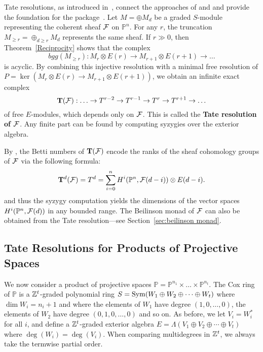 \documentclass[twoside,12pt, leqno]{amsart}
\def\PP{{\mathbb P}}
\DeclareMathOperator{\rH}{{\rm H}}
\def\bT{{\bf T}}
\def\bU{{\bf U}}
\def\rH{{\rm H}}
\begin{document}
Tate resolutions, as introduced in~\cite{EFS}, connect the approaches of \cite{BGG} and \cite{beilinson} and provide the foundation for the package~\cite{M2BGG}.
Let $M=\oplus M_d$ be a graded $S$-module representing the coherent sheaf ${\mathcal F}$ on $\PP^n$. For any $r$, the truncation $M_{\ge r} = \oplus_{d \ge r}M_d$ represents the same sheaf.  If $r\gg 0$, then Theorem~\ref{Reciprocity} shows that the  complex
$$
bgg(M_{\ge r}) : M_r\otimes E(r) \to M_{r+1}\otimes E(r+1) \to \ldots
$$ 
is acyclic. By combining this injective resolution with a minimal free resolution of $P=\ker(M_r\otimes E(r) \to M_{r+1}\otimes E(r+1))$, we obtain an infinite exact complex
$$
\bT(\sF):   \ldots \to T^{r-2} \to T^{r-1} \to T^r \to T^{r+1} \to \ldots
$$
of free $E$-modules, which depends only on ${\mathcal F}$.  This is called the {\bf Tate resolution of ${\mathcal F}$}. Any finite part can be found by computing syzygies over the exterior algebra.

By \cite[Theorem 4.1] {EFS}, the Betti numbers of $\bT(\sF)$ encode the ranks of the sheaf cohomology groups of ${\mathcal F}$ via the following formula:
$$
\bT^d(\sF) =T^d= \sum_{i=0}^n H^i(\PP^n,\sF(d-i)) \otimes E(d-i).
$$
and thus the syzygy computation yields the dimensions of the vector spaces $H^i(\PP^n,\sF(d))$ in any bounded range. The Beilinson monad of ${\mathcal F}$ can also be obtained from the Tate resolution---see Section~\ref{sec:beilinson monad}.

% 
% 

\subsection{Tate Resolutions for Products of Projective Spaces}
We now consider a product of projective spaces $\PP = \PP^{n_1}\times \ldots \times \PP^{n_{t}}$.  The Cox ring of $\PP$ is a ${\mathbb Z}^{t}$-graded polynomial ring $S=\operatorname{Sym} (W_1\oplus W_2 \oplus \cdots \oplus W_t)$ where $\dim W_i=n_i+1$ and where the elements of $W_1$ have degree $(1,0,\dots,0)$, the elements of $W_2$ have degree $(0,1,0,\dots,0)$ and so on.  As before, we let $V_i=W_i^*$ for all $i$, and define a ${\mathbb Z}^{t}$-graded exterior algebra $E=\Lambda (V_1\oplus V_2\oplus \cdots \oplus V_t)$ where $\deg(W_i)=\deg(V_i)$.  When comparing multidegrees in ${\mathbb Z}^t$, we always take the termwise partial order.  
\end{document}
